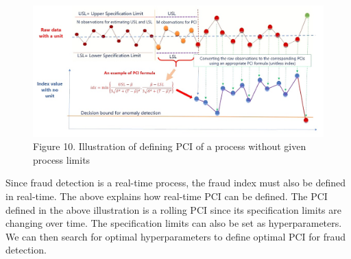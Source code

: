 \documentclass[
]{article}
\begin{document}
\begin{figure}

{\centering \includegraphics[width=15.65in]{img/w10-Rolling-PCIs} 

}

\caption{Figure 10. Illustration of defining PCI of a process without given process limits}\label{fig:unnamed-chunk-13}
\end{figure}

Since fraud detection is a real-time process, the fraud index must also
be defined in real-time. The above explains how real-time PCI can be
defined. The PCI defined in the above illustration is a rolling PCI
since its specification limits are changing over time. The specification
limits can also be set as hyperparameters. We can then search for
optimal hyperparameters to define optimal PCI for fraud detection.
\end{document}
